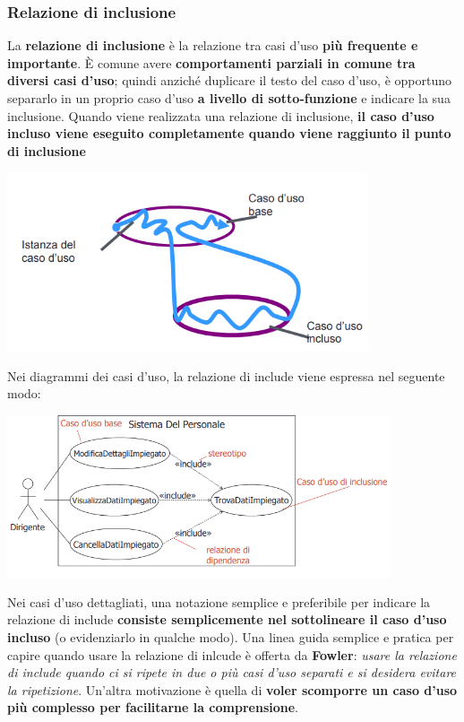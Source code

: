 \documentclass[12pt]{article}
\begin{document}
\subsubsection{Relazione di inclusione}
La \textbf{relazione di inclusione} è la relazione tra casi d'uso \textbf{più frequente e importante}.
È comune avere \textbf{comportamenti parziali in comune tra diversi casi d'uso}; quindi anziché duplicare il testo del caso d'uso, è opportuno separarlo in un proprio caso d'uso \textbf{a livello di sotto-funzione} e indicare la sua inclusione.
Quando viene realizzata una relazione di inclusione, \textbf{il caso d'uso incluso viene eseguito completamente quando viene raggiunto il punto di inclusione}
\begin{center}
    \includegraphics[width = 0.80\textwidth]{Images/42.png}
\end{center}
Nei diagrammi dei casi d'uso, la relazione di include viene espressa nel seguente modo:
\begin{center}
    \includegraphics[width = 0.85\textwidth]{Images/43.png}
\end{center}
Nei casi d'uso dettagliati, una notazione semplice e preferibile per indicare la relazione di include \textbf{consiste semplicemente nel sottolineare il caso d'uso incluso} (o evidenziarlo in qualche modo).
Una linea guida semplice e pratica per capire quando usare la relazione di inlcude è offerta da \textbf{Fowler}: \textit{usare la relazione di include quando ci si ripete in due o più casi d'uso separati e si desidera evitare la ripetizione}.
Un'altra motivazione è quella di \textbf{voler scomporre un caso d'uso più complesso per facilitarne la comprensione}.
\end{document}
